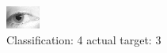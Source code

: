 \begin{figure}[h!]
\begin{center}
\includegraphics[width=0.60\columnwidth]{figures/ID1351_class_4_target_3.png}
\end{center}
\caption{ Classification: 4 actual target: 3}
\label{fig:ID1351_class_4_target_3}
\end{figure}
